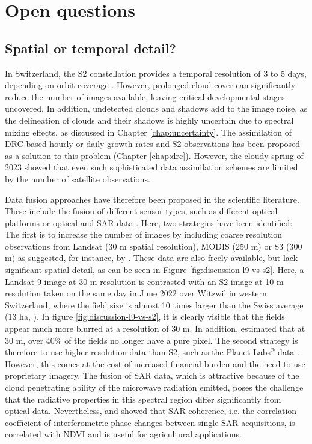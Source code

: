 \section{Open questions}
\label{sec:disc-open-questions}
\subsection{Spatial or temporal detail?}
In Switzerland, the \gls{S2} constellation provides a temporal resolution of 3 to 5 days, depending on orbit coverage \citep{pazur_national_2022}. However, prolonged cloud cover can significantly reduce the number of images available, leaving critical developmental stages uncovered. In addition, undetected clouds and shadows add to the image noise, as the delineation of clouds and their shadows is highly uncertain due to spectral mixing effects, as discussed in Chapter \ref{chap:uncertainty}. The assimilation of \gls{DRC}-based hourly or daily growth rates and \gls{S2} observations has been proposed as a solution to this problem (Chapter \ref{chap:drc}). However, the cloudy spring of 2023 showed that even such sophisticated data assimilation schemes are limited by the number of satellite observations.

Data fusion approaches have therefore been proposed in the scientific literature. These include the fusion of different sensor types, such as different optical platforms or optical and \gls{SAR} data \citep[for example]{pipia_fusing_2019, lobert_mowing_2021}. Here, two strategies have been identified: The first is to increase the number of images by including coarse resolution observations from Landsat (30 m spatial resolution), \gls{MODIS} (250 m) or \gls{S3} (300 m) as suggested, for instance, by \cite{zhou_reconstruction_2020}. These data are also freely available, but lack significant spatial detail, as can be seen in Figure \ref{fig:discussion-l9-vs-s2}. Here, a Landsat-9 image at 30 m resolution is contrasted with an S2 image at 10 m resolution taken on the same day in June 2022 over Witzwil in western Switzerland, where the field size is almost 10 times larger than the Swiss average (13 ha, \cite{perich_pixel-based_2023}). In figure \ref{fig:discussion-l9-vs-s2}, it is clearly visible that the fields appear much more blurred at a resolution of 30 m. In addition, \cite{meier_assessments_2020} estimated that at 30 m, over 40\% of the fields no longer have a pure pixel. The second strategy is therefore to use higher resolution data than \gls{S2}, such as the Planet Labs$^{\circledR}$ data \citep[for example]{sadeh_fusion_2021}. However, this comes at the cost of increased financial burden and the need to use proprietary imagery. The fusion of \gls{SAR} data, which is attractive because of the cloud penetrating ability of the microwave radiation emitted, poses the challenge that the radiative properties in this spectral region differ significantly from optical data. Nevertheless, \cite{bai_could_2020} and \cite{villarroya-carpio_sentinel-1_2022} showed that \gls{SAR} coherence, i.e. the correlation coefficient of interferometric phase changes between single \gls{SAR} acquisitions, is correlated with \gls{NDVI} and is useful for agricultural applications.

